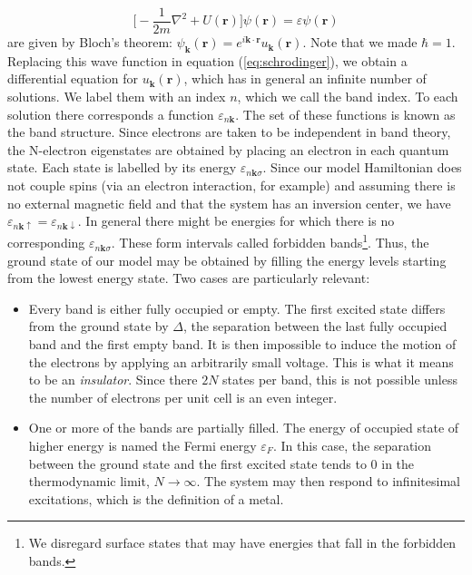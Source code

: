 \begin{equation}\label{eq:schrodinger}
\bigg[ -\frac{1}{2m} \nabla^2 + U(\bm r) \bigg] \psi (\bm r) = \varepsilon \psi (\bm r)
\end{equation}
are given by Bloch's theorem: $\psi_{\bm k} (\bm r) = e^{i\bm k \cdot \bm r} u_{\bm k} (\bm r)$. Note that we made $\hbar = 1$. Replacing this wave function in equation (\ref{eq:schrodinger}), we obtain a differential equation for $u_{\bm k} (\bm r)$, which has in general an infinite number of solutions. We label them with an index $n$, which we call the band index. To each solution there corresponds a function $\varepsilon_{n\bm k}$. The set of these functions is known as the band structure. Since electrons are taken to be independent in band theory, the N-electron eigenstates are obtained by placing an electron in each quantum state. Each state is labelled by its energy $\varepsilon_{n\bm k \sigma}$. Since our model Hamiltonian does not couple spins (via an electron interaction, for example) and assuming there is no external magnetic field and that the system has an inversion center, we have $\varepsilon_{n\bm k \uparrow} = \varepsilon_{n\bm k \downarrow}$. In general there might be energies for which there is no corresponding $\varepsilon_{n\bm k \sigma}$. These form intervals called forbidden bands\footnote{We disregard surface states that may have energies that fall in the forbidden bands.}. Thus, the ground state of our model may be obtained by filling the energy levels starting from the lowest energy state. Two cases are particularly relevant:
\begin{itemize}
\item Every band is either fully occupied or empty. The first excited state differs from the ground state by $\Delta$, the separation between the last fully occupied band and the first empty band. It is then impossible to induce the motion of the electrons by applying an arbitrarily small voltage. This is what it means to be an \emph{insulator}. Since there $2N$ states per band, this is not possible unless the number of electrons per unit cell is an even integer.
\item One or more of the bands are partially filled. The energy of occupied state of higher energy is named the Fermi energy $\varepsilon_F$. In this case, the separation between the ground state and the first excited state tends to $0$ in the thermodynamic limit, $N \rightarrow \infty$. The system may then respond to infinitesimal excitations, which is the  definition of a metal.
\end{itemize}

